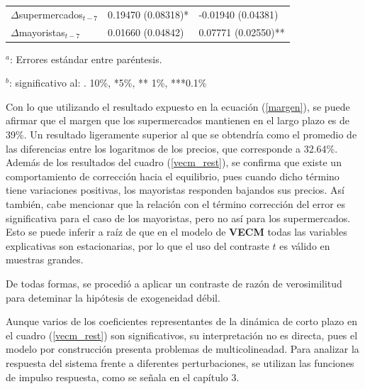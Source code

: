 \documentclass[12pt, twoside]{book}\usepackage[]{graphicx}\usepackage[]{color}
\numberwithin{equation}{section}
\numberwithin{theorem}{section}
\numberwithin{teorema}{section}
\numberwithin{defi}{section}
\numberwithin{prop}{section}
\numberwithin{defi}{section}
\theoremstyle{plain}
\begin{document}
\begin{table}[!htpb]
\begin{threeparttable}
\begin{tabular}{@{}lll@{}}
$\Delta$supermercados$_{t-7} $ & 0.19470 (0.08318)*    &  -0.01940 (0.04381)  \\     
$\Delta$mayoristas$_{t-7}    $ &  0.01660 (0.04842)  &  0.07771 (0.02550)**   \\   
\bottomrule
\end{tabular}
\begin{tablenotes}
\small 
\item $^{a}$: Errores estándar entre paréntesis. 
\item $^{b}$: significativo al: . 10\%, *5\%, ** 1\%, ***0.1\%
\end{tablenotes}
\end{threeparttable}
\end{table}

Con lo que utilizando el resultado expuesto en la ecuación (\ref{margen}), se puede afirmar que el margen que los supermercados mantienen en el largo plazo es de 39\%. Un resultado ligeramente superior al que se obtendría como el promedio de las diferencias entre los logaritmos de los precios, que corresponde a 32.64\%. Además de los resultados del cuadro (\ref{vecm_rest}), se confirma que existe un comportamiento de corrección hacia el equilibrio, pues cuando dicho término tiene variaciones positivas, los mayoristas responden bajandos sus precios. Así también, cabe mencionar que la relación con el término corrección del error es significativa para el caso de los mayoristas, pero no así para los supermercados. Esto se puede inferir a raíz de que en el modelo de \textbf{VECM} todas las variables explicativas son estacionarias, por lo que el uso del contraste $t$ es válido en muestras grandes. 

De todas formas, se procedió a aplicar un contraste de razón de verosimilitud para deteminar la hipótesis de exogeneidad débil. 




Aunque varios de los coeficientes representantes de la dinámica de corto plazo en el cuadro (\ref{vecm_rest}) son significativos, su interpretación no es directa, pues el modelo por construcción presenta problemas de multicolineadad. Para analizar la respuesta del sistema frente a diferentes perturbaciones, se utilizan las funciones de impulso respuesta, como se señala en el capítulo 3. 
\end{document}
